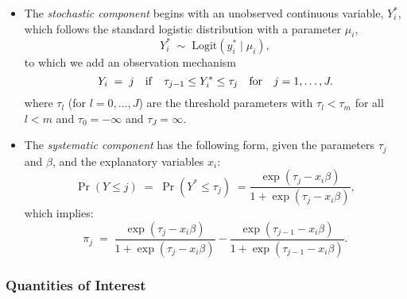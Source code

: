 \begin{itemize}
\item The \emph{stochastic component} begins with an unobserved continuous
  variable, $Y^*_i$, which follows the standard logistic distribution
  with a parameter $\mu_i$,
  \begin{equation*}
    Y_i^* \; \sim \; \textrm{Logit}(y_i^* \mid \mu_i),  
  \end{equation*}
  to which we add an observation mechanism
  \begin{equation*}
    Y_i \; = \; j \quad {\rm if} \quad \tau_{j-1} \le Y_i^* \le \tau_j
    \quad {\rm for} \quad j=1,\dots,J.
  \end{equation*}
  where $\tau_l$ (for $l=0,\dots,J$) are the threshold parameters with
  $\tau_l < \tau_m$ for all $l<m$ and $\tau_0=-\infty$ and
  $\tau_J=\infty$.
  
\item The \emph{systematic component} has the following form, given
  the parameters $\tau_j$ and $\beta$, and the explanatory variables $x_i$: 
  \begin{equation*}
    \Pr(Y \le j) \; = \; \Pr(Y^* \le \tau_j) \; = \frac{\exp(\tau_j -
      x_i \beta)}{1+\exp(\tau_j -x_i \beta)},
  \end{equation*}
  which implies:
  \begin{equation*}
    \pi_{j}  \; = \; \frac{\exp(\tau_j - x_i \beta)}{1 + \exp(\tau_j -
      x_i \beta)} - \frac{\exp(\tau_{j-1} - x_i \beta)}{1 +
      \exp(\tau_{j-1} - x_i \beta)}.
  \end{equation*}
\end{itemize}

\subsubsection{Quantities of Interest} 

